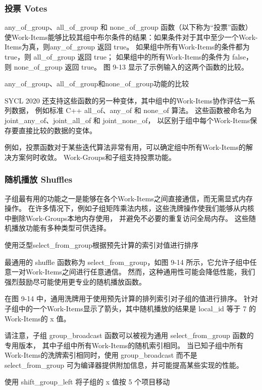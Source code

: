 \subsubsection{投票 Votes}
any\_of\_group、all\_of\_group 和 none\_of\_group 函数（以下称为“投票”函数）
使Work-Items能够比较其组中布尔条件的结果：如果条件对于其中至少一个Work-Items为真，则any\_of\_group 返回 true。 
如果组中所有Work-Items的条件都为 true，则 all\_of\_group 返回 true；
如果组中的所有Work-Items的条件为 false，则 none\_of\_group 返回 true。 
图 9-13 显示了示例输入的这两个函数的比较。

{\color{red} any\_of\_group、all\_of\_group和none\_of\_group功能的比较}

SYCL 2020 还支持这些函数的另一种变体，其中组中的Work-Items协作评估一系列数据，
例如标准 C++ all\_of、any\_of 和 none\_of 算法。 
这些函数被命名为 joint\_any\_of、joint\_all\_of 和 joint\_none\_of，
以区别于组中每个Work-Items保存要直接比较的数据的变体。

例如，投票函数对于某些迭代算法非常有用，可以确定组中所有Work-Items的解决方案何时收敛。 
Work-Groups和子组支持投票功能。

\subsubsection{随机播放 Shuffles}
子组最有用的功能之一是能够在各个Work-Items之间直接通信，而无需显式内存操作。 
在许多情况下，例如子组矩阵乘法内核，这些洗牌操作使我们能够从内核中删除Work-Groups本地内存使用，
并避免不必要的重复访问全局内存。 这些随机播放功能有多种类型可供选择。

{\color{red} 使用泛型select\_from\_group根据预先计算的索引对值进行排序}

最通用的 shuffle 函数称为 select\_from\_group，如图 9-14 所示，它允许子组中任意一对Work-Items之间进行任意通信。 
然而，这种通用性可能会降低性能，我们强烈鼓励尽可能使用更专业的随机播放函数。

在图 9-14 中，通用洗牌用于使用预先计算的排列索引对子组的值进行排序。 
针对子组中的一个Work-Items显示了箭头，其中随机播放的结果是 local\_id 等于 7 的Work-Items的 x 值。

请注意，子组 group\_broadcast 函数可以被视为通用 select\_from\_group 函数的专用版本，
其中子组中所有Work-Items的随机索引相同。 
当已知子组中所有Work-Items的洗牌索引相同时，使用 group\_broadcast 
而不是 select\_from\_group 可为编译器提供附加信息，并可能提高某些实现的性能。

{\color{red} 使用 shift\_group\_left 将子组的 x 值按 5 个项目移动}


